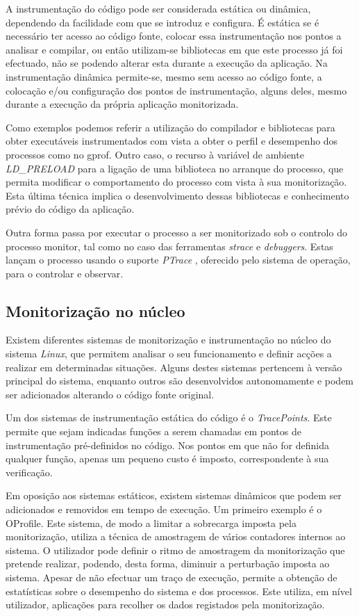\documentclass[a4paper]{llncs}
\begin{document}
A instrumentação do código pode ser considerada estática ou dinâmica, dependendo da facilidade com que se introduz e configura.
 É estática se é necessário ter acesso ao código fonte, colocar essa instrumentação nos pontos a analisar e compilar, ou então utilizam-se bibliotecas em que este processo já foi efectuado, não se podendo alterar esta durante a execução da aplicação.
 Na instrumentação dinâmica permite-se, mesmo sem acesso ao código fonte, a colocação e/ou configuração dos pontos de instrumentação, alguns deles, mesmo durante a execução da própria aplicação monitorizada. 

Como exemplos podemos referir a utilização do compilador e bibliotecas para obter executáveis instrumentados com vista a obter o perfil e desempenho dos processos como no gprof\cite{Graham:1982:GCG:800230.806987}.
Outro caso, o recurso à variável de ambiente \textit{LD\_PRELOAD} para a ligação de uma biblioteca no arranque do processo, que permita modificar o comportamento do processo com vista à sua monitorização. Esta última técnica implica o desenvolvimento dessas bibliotecas e conhecimento prévio do código da aplicação.

Outra forma passa por executar o processo a ser monitorizado sob o controlo do processo monitor, tal como no caso das ferramentas \textit{strace} e  \textit{debuggers}.
 Estas lançam o processo usando o suporte \textit{PTrace}%
, oferecido pelo sistema de operação, para o controlar e observar.

\subsection{Monitorização no núcleo}
\label{sub_kernel_instrumentation}

Existem diferentes sistemas de monitorização e instrumentação no núcleo do sistema \textit{Linux}, que permitem analisar o seu funcionamento e definir acções a realizar em determinadas situações.
 Alguns destes sistemas pertencem à versão principal do sistema, enquanto outros são desenvolvidos autonomamente e podem ser adicionados alterando o código fonte original. 

Um dos sistemas de instrumentação estática do código é o \textit{TracePoints}.
 Este permite que sejam indicadas funções a serem chamadas em pontos de instrumentação pré-definidos no código.
 Nos pontos em que não for definida qualquer função, apenas um pequeno custo é imposto, correspondente à sua verificação. 

Em oposição aos sistemas estáticos, existem sistemas dinâmicos que podem  ser adicionados e removidos em tempo de execução.
 Um primeiro exemplo é o OProfile\cite{oprofile}.
Este sistema, de modo a limitar a sobrecarga imposta pela monitorização, utiliza a técnica de amostragem de vários contadores internos ao sistema.
 O utilizador pode definir o ritmo de amostragem da monitorização que pretende realizar, podendo, desta forma, diminuir a perturbação imposta ao sistema.
 Apesar de não efectuar um traço de execução, permite a obtenção de estatísticas sobre o desempenho do sistema e dos processos.
 Este utiliza, em nível utilizador, aplicações para recolher os dados registados pela monitorização.
\end{document}
